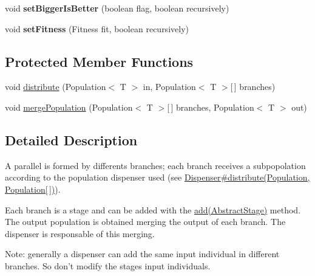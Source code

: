 \begin{DoxyCompactItemize}
\item 
\hypertarget{classjenes_1_1stage_1_1_parallel_3_01_t_01extends_01_chromosome_01_4_ae8ea18096e341f41bf44c56ba1628a99}{void {\bfseries set\-Bigger\-Is\-Better} (boolean flag, boolean recursively)}\label{classjenes_1_1stage_1_1_parallel_3_01_t_01extends_01_chromosome_01_4_ae8ea18096e341f41bf44c56ba1628a99}

\item 
\hypertarget{classjenes_1_1stage_1_1_parallel_3_01_t_01extends_01_chromosome_01_4_ae50a3b3fae5a0b2c3465a0bae243263b}{void {\bfseries set\-Fitness} (Fitness fit, boolean recursively)}\label{classjenes_1_1stage_1_1_parallel_3_01_t_01extends_01_chromosome_01_4_ae50a3b3fae5a0b2c3465a0bae243263b}

\end{DoxyCompactItemize}
\subsection*{Protected Member Functions}
\begin{DoxyCompactItemize}
\item 
void \hyperlink{classjenes_1_1stage_1_1_parallel_3_01_t_01extends_01_chromosome_01_4_aafb82610de353045546319738543fab9}{distribute} (Population$<$ T $>$ in, Population$<$ T $>$\mbox{[}$\,$\mbox{]} branches)
\item 
void \hyperlink{classjenes_1_1stage_1_1_parallel_3_01_t_01extends_01_chromosome_01_4_a9cd26799d837f1e1f5ddfcabd0d18aaa}{merge\-Population} (Population$<$ T $>$\mbox{[}$\,$\mbox{]} branches, Population$<$ T $>$ out)
\end{DoxyCompactItemize}


\subsection{Detailed Description}
A parallel is formed by differents branches; each branch receives a subpopolation according to the population dispenser used (see \hyperlink{}{Dispenser\#distribute(\-Population, Population\mbox{[}$\,$\mbox{]})}).\par
 

Each branch is a stage and can be added with the \hyperlink{}{add(\-Abstract\-Stage)} method. The output population is obtained merging the output of each branch. The dispenser is responsable of this merging. 

Note\-: generally a dispenser can add the same input individual in different branches. So don't modify the stages input individuals. 


